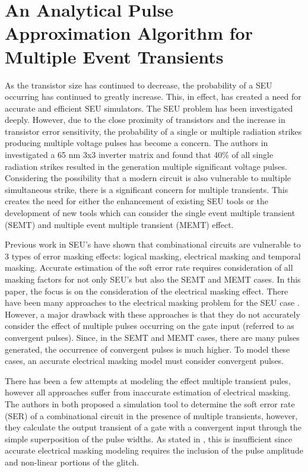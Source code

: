 
\chapter{An Analytical Pulse Approximation Algorithm for Multiple Event Transients} \label{ch2}

As the transistor size has continued to decrease, the probability of a SEU occurring has continued to greatly increase. This, in effect, has created a need for accurate and efficient SEU simulators. The SEU problem has been investigated deeply. \cite{MARS_C,SERA,FASER} However, due to the close proximity of transistors and the increase in transistor error sensitivity, the probability of a single or multiple radiation strikes producing multiple voltage pulses has become a concern. The authors in \cite{Harada} investigated a 65 nm 3x3 inverter matrix and found that 40\% of all single radiation strikes resulted in the generation multiple significant voltage pulses. Considering the possibility that a modern circuit is also vulnerable to multiple simultaneous strike, there is a significant concern for multiple transients. This creates the need for either the enhancement of existing SEU tools or the development of new tools which can consider the single event multiple transient (SEMT) and multiple event multiple transient (MEMT) effect.

Previous work in SEU’s have shown that combinational circuits are vulnerable to 3 types of error masking effects: logical masking, electrical masking and temporal masking. Accurate estimation of the soft error rate requires consideration of all masking factors for not only SEU’s but also the SEMT and MEMT cases. In this paper, the focus is on the consideration of the electrical masking effect. There have been many approaches to the electrical masking problem for the SEU case \cite{Omana_Trap,Accurate_Masking,Weibull}. However, a major drawback with these approaches is that they do not accurately consider the effect of multiple pulses occurring on the gate input (referred to as convergent pulses). Since, in the SEMT and MEMT cases, there are many pulses generated, the occurrence of convergent pulses is much higher. To model these cases, an accurate electrical masking model must consider convergent pulses. 

There has been a few attempts at modeling the effect multiple transient pules, however all approaches suffer from inaccurate estimation of electrical masking. The authors in \cite{METSys,TahooriMET} both proposed a simulation tool to determine the soft error rate (SER) of a combinational circuit in the presence of multiple transients, however, they calculate the output transient of a gate with a convergent input through the simple superposition of the pulse widths. As stated in \cite{Accurate_Masking}, this is insufficient since accurate electrical masking modeling requires the inclusion of the pulse amplitude and non-linear portions of the glitch.

